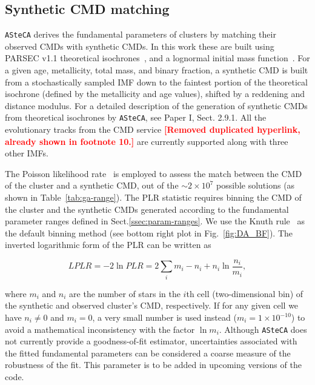\documentclass[draft]{aa}
\newcommand{\LEt}[1]{\textcolor{red}{\textbf{[#1]}}}
\begin{document}
\subsection{Synthetic CMD matching}
\label{ssec:synth-match}

\texttt{ASteCA} derives the fundamental parameters of clusters by matching their observed
CMDs with synthetic CMDs. In this work these are built using PARSEC v1.1
theoretical isochrones~\citep[][B12]{Bressan_2012},
and a lognormal initial mass function~\citep[IMF;][]{Chabrier_2001}.
%
For a given age, metallicity, total mass, and binary fraction, a
synthetic CMD is built from a stochastically sampled IMF down to the
faintest portion of the theoretical isochrone (defined by the metallicity and
age values), shifted by a reddening and distance modulus. For a detailed
description of the generation of synthetic CMDs from theoretical
isochrones by \texttt{ASteCA}, see Paper I, Sect. 2.9.1. All the evolutionary
tracks from the CMD service \LEt{Removed duplicated hyperlink, already shown in
footnote 10.} are currently supported along with three other IMFs.

The Poisson likelihood rate~\citep[PLR;][]{Dolphin_2002} is employed
to assess the match between the CMD of the cluster and a synthetic
CMD, out of the ${\sim}2{\times}10^7$ possible solutions (as shown in
Table~\ref{tab:ga-range}).
The PLR statistic requires binning the CMD of the cluster and the synthetic CMDs
generated according to the fundamental parameter ranges defined in
Sect.\ref{ssec:param-ranges}.
We use the Knuth rule~\citep[][also implemented via the astroML package]
{Knuth_2006} as the default binning method (see bottom right plot in
Fig.~\ref{fig:DA_BF}).
The inverted logarithmic form of the PLR can be written as

\begin{equation}
LPLR  = -2 \ln PLR = 2 \sum_i m_i - n_i + n_i \ln \frac{n_i}{m_i},
\label{eq:likelihood}
\end{equation}

\noindent where $m_i$ and $n_i$ are the number of stars in the $i$th cell
(two-dimensional bin) of the synthetic and  observed cluster's CMD,
respectively. If for any given cell we have $n_i\neq0$ and $m_i=0$, a
very small number is used instead ($m_i=1{\times}10^{-10}$) to avoid a
mathematical inconsistency with the factor $\ln m_i$.
Although \texttt{ASteCA} does not currently provide a goodness-of-fit
estimator, uncertainties associated with the fitted fundamental parameters
can be considered a coarse measure of the robustness of the fit. This parameter is
to be added in upcoming versions of the code.
\end{document}
